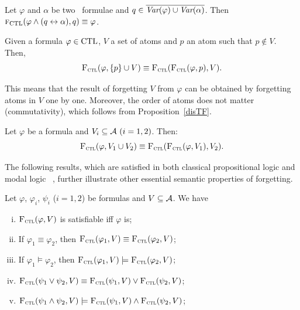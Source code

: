 \documentclass[letterpaper]{article} %
\begin{document}
\begin{lemma}\label{lem:KF:eq}
	Let $\varphi$ and $\alpha$ be two \CTL\ formulae and $q\in
		\overline{\textit{Var}(\varphi) \cup \textit{Var}(\alpha)}$. Then
	${\textsc{f}_{\textrm{CTL}}}(\varphi \wedge (q\leftrightarrow\alpha), q)\equiv \varphi$.
\end{lemma}


\begin{proposition}\label{disTF}
Given a formula $\varphi \in \textrm{CTL}$, $V$ a set of atoms and $p$ an atom such that $p \notin V$. Then,
\[
{\textsc{F}_{\textsc{ctl}}}(\varphi, \{p\} \cup V) \equiv {\textsc{F}_{\textsc{ctl}}}({\textsc{F}_{\textsc{ctl}}}(\varphi, p), V).
\]
\end{proposition}
This means that the result of forgetting $V$ from $\varphi$ can be obtained by forgetting atoms in $V$ one by one.
Moreover, the order of atoms does not matter (commutativity), which follows from  Proposition~\ref{disTF}.

\begin{corollary}[Commutativity]\label{disTFV}
Let $\varphi$ be a formula and $V_i\subseteq{\cal A}~(i=1,2)$. Then:
\[
{\textsc{F}_{\textsc{ctl}}}(\varphi, V_1 \cup V_2) \equiv {\textsc{F}_{\textsc{ctl}}}({\textsc{F}_{\textsc{ctl}}}(\varphi, V_1), V_2).
\]
\end{corollary}


The following results, which are satisfied in both classical propositional logic and modal logic \SFive~\cite{Yan:AIJ:2009}, further illustrate other essential semantic properties of forgetting.
\begin{proposition}\label{pro:ctl:forget:1}
Let $\varphi$, $\varphi_i$, $\psi_i$ ($i=1,2$) be formulas and $V\subseteq {\cal A}$. We have
\begin{enumerate}[(i)]
  \item ${\textsc{F}_{\textsc{ctl}}}(\varphi, V)$ is satisfiable iff $\varphi$ is;
  \item If $\varphi_1 \equiv \varphi_2$, then ${\textsc{F}_{\textsc{ctl}}}(\varphi_1, V) \equiv {\textsc{F}_{\textsc{ctl}}}(\varphi_2, V)$;
  \item If $\varphi_1 \models \varphi_2$, then ${\textsc{F}_{\textsc{ctl}}}(\varphi_1, V) \models {\textsc{F}_{\textsc{ctl}}}(\varphi_2, V)$;
  \item ${\textsc{F}_{\textsc{ctl}}}(\psi_1 \vee \psi_2, V) \equiv {\textsc{F}_{\textsc{ctl}}}(\psi_1, V) \vee {\textsc{F}_{\textsc{ctl}}}(\psi_2, V)$;
  \item ${\textsc{F}_{\textsc{ctl}}}(\psi_1 \wedge \psi_2, V) \models {\textsc{F}_{\textsc{ctl}}}(\psi_1, V) \wedge {\textsc{F}_{\textsc{ctl}}}(\psi_2, V)$;
\end{enumerate}
\end{proposition}
\end{document}
